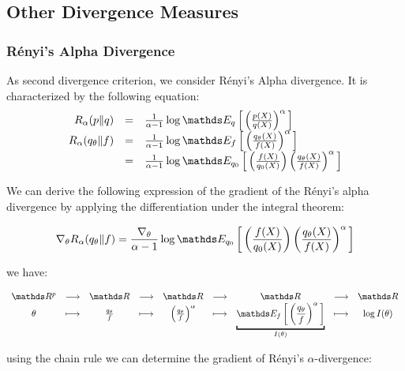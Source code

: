 \subsection{Other Divergence Measures}

\subsubsection{Rényi's Alpha Divergence}\label{RalphaDiv}

As second divergence criterion, we consider Rényi's Alpha divergence. It is characterized by the following equation:
$$
\begin{array}{rcl}
	R_\alpha(p \Vert q) &=& \frac 1 {\alpha - 1} \log \esperanceloi q { \left( \frac {p(X)} {q(X)} \right)^\alpha }
\\
R_\alpha(q_\theta \Vert f) &=& 
\frac 1 {\alpha - 1} \log \esperanceloi f { \left( \frac {q_\theta(X)} {f(X)} \right)^\alpha }
\\
&=& 
\frac {1}{\alpha - 1} \log \esperanceloi{ q_0 }{ \left( \frac{f(X)}{q_0(X)} \right) \left( \frac {q_\theta(X)} {f(X)} \right)^\alpha }
\end{array}
$$

We can derive the following expression of the gradient of the Rényi's alpha divergence by applying the differentiation under the integral theorem:


$$\nabla_\theta R_\alpha(q_\theta \Vert f) = \frac {\nabla_\theta}{\alpha - 1} \log \esperanceloi{ q_0 }{ \left( \frac{f(X)}{q_0(X)} \right)  \left( \frac {q_\theta(X)} {f(X)} \right)^\alpha }$$

we have:

$$\begin{array}{ccccccccc}
    \mathds R^p& \longrightarrow       &  \mathds R   & \longrightarrow       & \mathds R & \longrightarrow       & \mathds R & \longrightarrow       & \mathds R \\
    \theta & \longmapsto   &  \frac{q_\theta}{f}  & \longmapsto   & \left(\frac{q_\theta}{f}\right) ^\alpha & \longmapsto   & \underbracket{\esperanceloi f { \left(\frac{q_\theta}{f}\right) ^\alpha}}_{I(\theta)} & \longmapsto   &  \log I(\theta)
\end{array}$$

using the chain rule we can determine the gradient of Rényi's $\alpha$-divergence:

